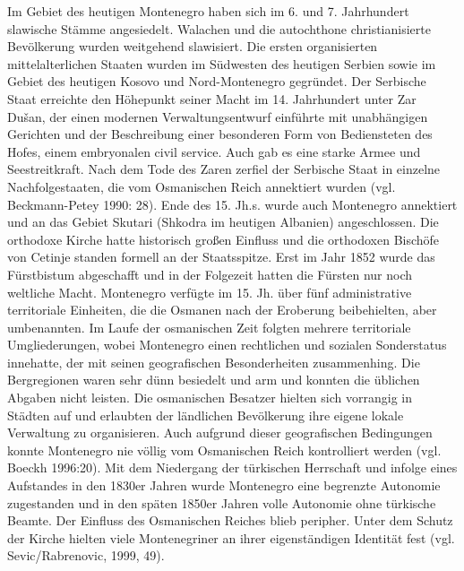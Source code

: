 Im Gebiet des heutigen Montenegro haben sich im 6. und 7. Jahrhundert slawische Stämme angesiedelt. Walachen und die autochthone christianisierte Bevölkerung wurden weitgehend slawisiert. Die ersten organisierten mittelalterlichen Staaten wurden im Südwesten des heutigen Serbien sowie im Gebiet des heutigen Kosovo und Nord-Montenegro gegründet. Der Serbische Staat erreichte den Höhepunkt seiner Macht im 14. Jahrhundert unter Zar Dušan, der einen modernen Verwaltungsentwurf einführte mit unabhängigen Gerichten und der Beschreibung einer besonderen Form von Bediensteten des Hofes, einem embryonalen civil service. Auch gab es eine starke Armee und Seestreitkraft. Nach dem Tode des Zaren zerfiel der Serbische Staat in einzelne Nachfolgestaaten, die vom Osmanischen Reich annektiert wurden (vgl. Beckmann-Petey 1990: 28). Ende des 15. Jh.s. wurde auch Montenegro annektiert und an das Gebiet Skutari (Shkodra im heutigen Albanien) angeschlossen. Die orthodoxe Kirche hatte historisch großen Einfluss und die orthodoxen Bischöfe von Cetinje standen formell an der Staatsspitze. Erst im Jahr 1852 wurde das Fürstbistum abgeschafft und in der Folgezeit hatten die Fürsten nur noch weltliche Macht. Montenegro verfügte im 15. Jh. über fünf administrative territoriale Einheiten, die die Osmanen nach der Eroberung beibehielten, aber umbenannten. Im Laufe der osmanischen Zeit folgten mehrere territoriale Umgliederungen, wobei Montenegro einen rechtlichen und sozialen Sonderstatus innehatte, der mit seinen geografischen Besonderheiten zusammenhing. Die Bergregionen waren sehr dünn besiedelt und arm und konnten die üblichen Abgaben nicht leisten. Die osmanischen Besatzer hielten sich vorrangig in Städten auf und erlaubten der ländlichen Bevölkerung ihre eigene lokale Verwaltung zu organisieren. Auch aufgrund dieser geografischen Bedingungen konnte Montenegro nie völlig vom Osmanischen Reich kontrolliert werden (vgl. Boeckh 1996:20). Mit dem Niedergang der türkischen Herrschaft und infolge eines Aufstandes in den 1830er Jahren wurde Montenegro eine begrenzte Autonomie zugestanden und in den späten 1850er Jahren volle Autonomie ohne türkische Beamte. Der Einfluss des Osmanischen Reiches blieb peripher. Unter dem Schutz der Kirche hielten viele Montenegriner an ihrer eigenständigen Identität fest (vgl. Sevic/Rabrenovic, 1999, 49).\par

